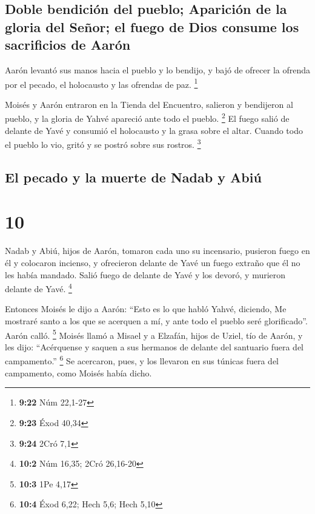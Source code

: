 \hypertarget{doble-bendiciuxf3n-del-pueblo-apariciuxf3n-de-la-gloria-del-seuxf1or-el-fuego-de-dios-consume-los-sacrificios-de-aaruxf3n}{%
\subsection{Doble bendición del pueblo; Aparición de la gloria del
Señor; el fuego de Dios consume los sacrificios de
Aarón}\label{doble-bendiciuxf3n-del-pueblo-apariciuxf3n-de-la-gloria-del-seuxf1or-el-fuego-de-dios-consume-los-sacrificios-de-aaruxf3n}}

 Aarón levantó sus manos hacia el pueblo y lo bendijo, y
bajó de ofrecer la ofrenda por el pecado, el holocausto y las ofrendas
de paz. \footnote{\textbf{9:22} Núm 22,1-27}

 Moisés y Aarón entraron en la Tienda del Encuentro,
salieron y bendijeron al pueblo, y la gloria de Yahvé apareció ante todo
el pueblo. \footnote{\textbf{9:23} Éxod 40,34}  El fuego
salió de delante de Yavé y consumió el holocausto y la grasa sobre el
altar. Cuando todo el pueblo lo vio, gritó y se postró sobre sus
rostros. \footnote{\textbf{9:24} 2Cró 7,1}

\hypertarget{el-pecado-y-la-muerte-de-nadab-y-abiuxfa}{%
\subsection{El pecado y la muerte de Nadab y
Abiú}\label{el-pecado-y-la-muerte-de-nadab-y-abiuxfa}}

\hypertarget{section-9}{%
\section{10}\label{section-9}}

 Nadab y Abiú, hijos de Aarón, tomaron cada uno su
incensario, pusieron fuego en él y colocaron incienso, y ofrecieron
delante de Yavé un fuego extraño que él no les había mandado.
 Salió fuego de delante de Yavé y los devoró, y murieron
delante de Yavé. \footnote{\textbf{10:2} Núm 16,35; 2Cró 26,16-20}

 Entonces Moisés le dijo a Aarón: ``Esto es lo que habló
Yahvé, diciendo, Me mostraré santo a los que se acerquen a mí, y ante
todo el pueblo seré glorificado''. Aarón calló. \footnote{\textbf{10:3}
  1Pe 4,17}  Moisés llamó a Misael y a Elzafán, hijos de
Uziel, tío de Aarón, y les dijo: ``Acérquense y saquen a sus hermanos de
delante del santuario fuera del campamento.'' \footnote{\textbf{10:4}
  Éxod 6,22; Hech 5,6; Hech 5,10}  Se acercaron, pues, y
los llevaron en sus túnicas fuera del campamento, como Moisés había
dicho.

